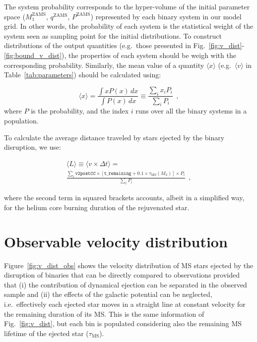 \documentclass{aa}
\DeclareRobustCommand{\Figref}[1]{Fig.~\ref{#1}}
\DeclareRobustCommand{\Tabref}[1]{Table~\ref{#1}}
\begin{document}
The system probability corresponds to the hyper-volume of the initial
parameter space ($M_1^\mathrm{ZAMS}$, $q^\mathrm{ZAMS}$,
$P^\mathrm{ZAMS}$) represented by each binary system in our model
grid. In other words, the probability of each system is the
statistical weight of the system seen as sampling point for the initial
distributions. To construct distributions of the output quantities (e.g.~those presented in
\Figref{fig:v_dist}-\ref{fig:bound_v_dist}), the properties of each
system should be weigh with the corresponding probability. Similarly,
the mean value of a quantity $\langle x \rangle$ (e.g.~$\langle v \rangle$ in
\Tabref{tab:parameters}) should be calculated using:

\begin{equation}
  \label{eq:mean}
  \langle x \rangle = \frac{\int x P(x)\,dx}{\int P(x)\,dx} \equiv
  \frac{\sum_i^{}  x_i P_i}{\sum_i^{} P_i} \ \ ,
\end{equation}
where $P$ is the probability, and the index $i$ runs over all the
binary systems in a population.

To calculate the average distance traveled by stars
ejected by the binary disruption, we use:

\begin{equation}
  \begin{aligned}
    \label{eq:meanD}
\langle L \rangle \equiv \langle v\times \Delta t\rangle = \\
  \frac{\sum_i \texttt{v2postCC}\times [\texttt{t\_remaining}+0.1\times\tau_\mathrm{MS}(M_2)]
    \times P_i}{\sum_i P_i} \ \ ,
  \end{aligned}
\end{equation}



where the second term in squared brackets accounts, albeit in a
simplified way, for the helium core burning duration of the
rejuvenated star.

\section{Observable velocity distribution}

Figure~\ref{fig:v_dist_obs} shows the velocity distribution of MS
stars ejected by the disruption of binaries that can
be directly compared to observations provided that (i) the
contribution of dynamical ejection can be separated in the observed
sample and (ii) the effects of the galactic potential can be
neglected, i.e.\ effectively each ejected star moves in a straight
line at constant velocity for the remaining duration of its MS. This is the same information of
\Figref{fig:v_dist}, but each bin is populated considering also the
remaining MS lifetime of the ejected star
($\tau_\mathrm{MS}$).
\end{document}
